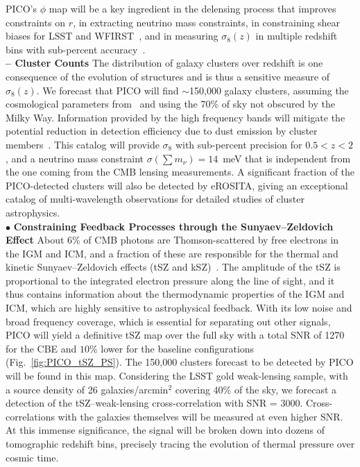 \documentclass[PICOAPC.tex]{subfiles}
\begin{document}
PICO's $\phi$ map will be a key ingredient in the delensing process that improves constraints on $r$, in extracting neutrino mass constraints, in constraining shear biases for LSST and WFIRST~\cite{schaan}, and in measuring $\sigma_{8}(z)$ in multiple redshift bins with sub-percent accuracy~\citep{pico_report}. \\
%
{\bf -- Cluster Counts} \hspace{0.1in} \label{clusters}  
The distribution of galaxy clusters over redshift is one consequence of the evolution of structures and is thus a sensitive measure of $\sigma_{8}(z)$. We forecast that PICO will find $\sim$150,000 galaxy clusters, assuming the cosmological parameters from \planck\  and using the 70\% of sky not obscured by the Milky Way.  Information provided by the high frequency bands will mitigate the potential reduction in detection efficiency due to dust emission by cluster members~\citep{melin_2018}. This catalog will provide $\sigma_{8}$ with sub-percent precision for $0.5 < z < 2$, and a neutrino mass constraint $\sigma(\sum m_{\nu}) = 14$~meV that is independent from the one coming from the CMB lensing measurements. A significant fraction of the PICO-detected clusters will also be detected by eROSITA, giving an exceptional catalog of multi-wavelength observations for detailed studies of cluster astrophysics. \\
%
$\bullet$ {\bf Constraining Feedback Processes through the Sunyaev--Zeldovich Effect} \hspace{0.1in} \label{sec:sz}
About 6\% of CMB photons are Thomson-scattered by free electrons in the \ac{IGM} and \ac{ICM}, and a fraction of these are responsible for the thermal and kinetic Sunyaev--Zeldovich effects (tSZ and kSZ)~\citep{zeldovich69,SZ1972}. The amplitude of the tSZ is proportional to the integrated electron pressure along the line of sight, and it thus contains information about the thermodynamic properties of the \ac{IGM} and \ac{ICM}, which are highly sensitive to astrophysical feedback. With its low noise and broad frequency coverage, which is essential for separating out other signals, PICO will yield a definitive tSZ map over the full sky with a total \ac{SNR} of 1270 for the CBE and $10$\% lower for the baseline configurations (Fig.~\ref{fig:PICO_tSZ_PS}).   
The 150,000 clusters forecast to be detected by PICO will be found in this map.
Considering the LSST gold weak-lensing sample, with a source density of 26 galaxies/arcmin${}^2$ covering 40\% of the sky, we forecast a detection of the tSZ--weak-lensing cross-correlation with \ac{SNR} = 3000.  Cross-correlations with the galaxies themselves will be measured at even higher \ac{SNR}.  At this immense significance, the signal will be broken down into dozens of tomographic redshift bins, precisely tracing the evolution of thermal pressure over cosmic time.  
\end{document}
